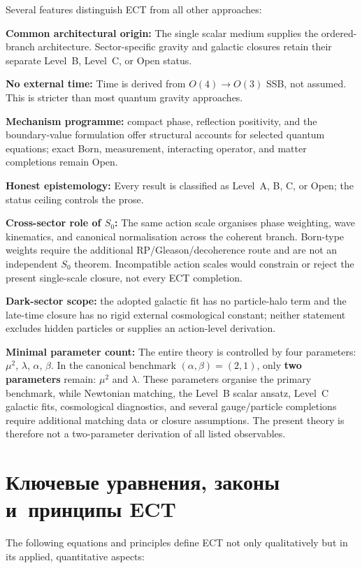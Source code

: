 \documentclass[11pt,a4paper]{article}
\begin{document}
Several features distinguish ECT from all other approaches:

\textbf{Common architectural origin:} The single scalar medium supplies the ordered-branch architecture.  Sector-specific gravity and galactic closures retain their separate Level~B, Level~C, or Open status.

\textbf{No external time:} Time is derived from $O(4) \to O(3)$ SSB, not assumed. This is stricter than most quantum gravity approaches.

\textbf{Mechanism programme:} compact phase, reflection positivity, and the boundary-value formulation offer structural accounts for selected quantum equations; exact Born, measurement, interacting operator, and matter completions remain Open.

\textbf{Honest epistemology:} Every result is classified as Level~A, B, C, or Open; the status ceiling controls the prose.

\textbf{Cross-sector role of $S_0$:} The same action scale organises phase weighting, wave kinematics, and canonical normalisation across the coherent branch.  Born-type weights require the additional RP/Gleason/decoherence route and are not an independent $S_0$ theorem. Incompatible action scales would constrain or reject the present single-scale closure, not every ECT completion.

\textbf{Dark-sector scope:} the adopted galactic fit has no particle-halo term and the late-time closure has no rigid external cosmological constant; neither statement excludes hidden particles or supplies an action-level derivation.

\textbf{Minimal parameter count:} The entire theory is controlled by four parameters: $\mu^2$, $\lambda$, $\alpha$, $\beta$. In the canonical benchmark $(\alpha, \beta) = (2, 1)$, only \textbf{two parameters} remain: $\mu^2$ and $\lambda$. These parameters organise the primary benchmark, while Newtonian matching, the Level~B scalar ansatz, Level~C galactic fits, cosmological diagnostics, and several gauge/particle completions require additional matching data or closure assumptions.  The present theory is therefore not a two-parameter derivation of all listed observables.


\section{Ключевые уравнения, законы и~принципы ECT}

The following equations and principles define ECT not only qualitatively but in its applied, quantitative aspects:
\end{document}
